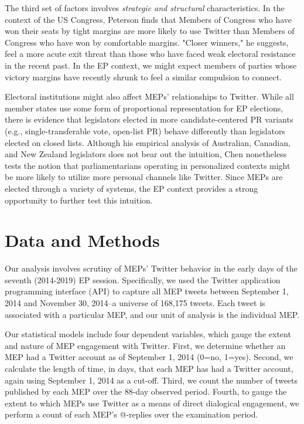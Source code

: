 \documentclass[12pt]{article}\usepackage[]{graphicx}\usepackage[]{color}
\begin{document}
    	The third set of factors involves \emph{strategic and structural} characteristics. In the context of the US Congress, Peterson \citeyear{peterson.2012} finds that Members of Congress who have won their seats by tight margins are more likely to use Twitter than Members of Congress who have won by comfortable margins. "Closer winners," he suggests, feel a more acute exit threat than those who have faced weak electoral resistance in the recent past. In the EP context, we might expect members of parties whose victory margins have recently shrunk to feel a similar compulsion to connect. 
      
      Electoral institutions might also affect MEPs' relationships to Twitter. While all member states use some form of proportional representation for EP elections, there is evidence \cite{hix.2004} that legislators elected in more candidate-centered PR variants (e.g., single-transferable vote, open-list PR) behave differently than legislators elected on closed lists. Although his empirical analysis of Australian, Canadian, and New Zealand legislators does not bear out the intuition, Chen \citeyear{chen.2010} nonetheless tests the notion that parliamentarians operating in personalized contexts might be more likely to utilize more personal channels like Twitter. Since MEPs are elected through a variety of systems, the EP context provides a strong opportunity to further test this intuition.
    
\section*{Data and Methods}

    Our analysis involves scrutiny of MEPs' Twitter behavior in the early days of the seventh (2014-2019) EP session. Specifically, we used the Twitter application programming interface (API) to capture all MEP tweets between September 1, 2014 and November 30, 2014--a universe of 168,175 tweets. Each tweet is associated with a particular MEP, and our unit of analysis is the individual MEP. 
    
    Our statistical models include four dependent variables, which gauge the extent and nature of MEP engagement with Twitter. First, we determine whether an MEP had a Twitter account as of September 1, 2014 (0=no, 1=yes). Second, we calculate the length of time, in days, that each MEP has had a Twitter account, again using September 1, 2014 as a cut-off. Third, we count the number of tweets published by each MEP over the 88-day observed period. Fourth, to gauge the extent to which MEPs use Twitter as a means of direct dialogical engagement, we perform a count of each MEP's @-replies over the examination period. 
    
\end{document}
